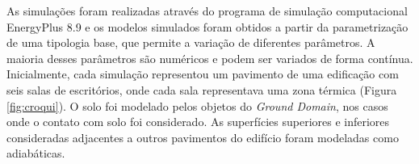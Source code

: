 \documentclass[brazil,hardcopy,openany]{ufscthesis} %
\begin{document}
%		

As simulações foram realizadas através do programa de simulação computacional EnergyPlus 8.9 \cite{EnergyPlus2018} e os modelos simulados foram obtidos a partir da parametrização de uma tipologia base, que permite a variação de diferentes parâmetros.  %
A maioria desses parâmetros são numéricos e podem ser variados de forma contínua. 
Inicialmente, cada simulação representou um pavimento de uma edificação com seis salas de escritórios, onde cada sala representava uma zona térmica (Figura \ref{fig:croqui}).
O solo foi modelado pelos objetos do \textit{Ground Domain}, nos casos onde o contato com solo foi considerado. As superfícies superiores e inferiores consideradas adjacentes a outros pavimentos do edifício foram modeladas como adiabáticas.
\end{document}
